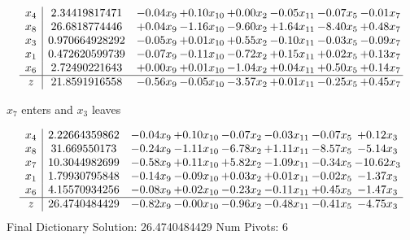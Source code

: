 \documentclass[9pt]{article}
\begin{document}
 \[\begin{array}{c| c c@{\hskip 2pt} c@{\hskip 2pt} c@{\hskip 2pt} c@{\hskip 2pt} c@{\hskip 2pt} c@{\hskip 2pt} }
 x_{4}   &  2.34419817471 & -0.04 x_{9} & +  0.10 x_{10} & +  0.00 x_{2} & -0.05 x_{11} & -0.07 x_{5} & -0.01 x_{7}\\
 x_{8}   &  26.6818774446 & +  0.04 x_{9} & -1.16 x_{10} & -9.60 x_{2} & +  1.64 x_{11} & -8.40 x_{5} & +  0.48 x_{7}\\
 x_{3}   &  0.970664928292 & -0.05 x_{9} & +  0.01 x_{10} & +  0.55 x_{2} & -0.10 x_{11} & -0.03 x_{5} & -0.09 x_{7}\\
 x_{1}   &  0.472620599739 & -0.07 x_{9} & -0.11 x_{10} & -0.72 x_{2} & +  0.15 x_{11} & +  0.02 x_{5} & +  0.13 x_{7}\\
 x_{6}   &  2.72490221643 & +  0.00 x_{9} & +  0.01 x_{10} & -1.04 x_{2} & +  0.04 x_{11} & +  0.50 x_{5} & +  0.14 x_{7}\\
\hline
z    &  21.8591916558 & -0.56 x_{9} & -0.05 x_{10} & -3.57 x_{2} & +  0.01 x_{11} & -0.25 x_{5} & +  0.45 x_{7}\\
\end{array}\]


 $ x_{7} $ enters and $ x_{3} $ leaves 

 \[\begin{array}{c| c c@{\hskip 2pt} c@{\hskip 2pt} c@{\hskip 2pt} c@{\hskip 2pt} c@{\hskip 2pt} c@{\hskip 2pt} }
 x_{4}   &  2.22664359862 & -0.04 x_{9} & +  0.10 x_{10} & -0.07 x_{2} & -0.03 x_{11} & -0.07 x_{5} & +  0.12 x_{3}\\
 x_{8}   &  31.669550173 & -0.24 x_{9} & -1.11 x_{10} & -6.78 x_{2} & +  1.11 x_{11} & -8.57 x_{5} & -5.14 x_{3}\\
 x_{7}   &  10.3044982699 & -0.58 x_{9} & +  0.11 x_{10} & +  5.82 x_{2} & -1.09 x_{11} & -0.34 x_{5} & -10.62 x_{3}\\
 x_{1}   &  1.79930795848 & -0.14 x_{9} & -0.09 x_{10} & +  0.03 x_{2} & +  0.01 x_{11} & -0.02 x_{5} & -1.37 x_{3}\\
 x_{6}   &  4.15570934256 & -0.08 x_{9} & +  0.02 x_{10} & -0.23 x_{2} & -0.11 x_{11} & +  0.45 x_{5} & -1.47 x_{3}\\
\hline
z    &  26.4740484429 & -0.82 x_{9} & -0.00 x_{10} & -0.96 x_{2} & -0.48 x_{11} & -0.41 x_{5} & -4.75 x_{3}\\
\end{array}\]
Final Dictionary
Solution:  26.4740484429
Num Pivots:  6
\end{document}
